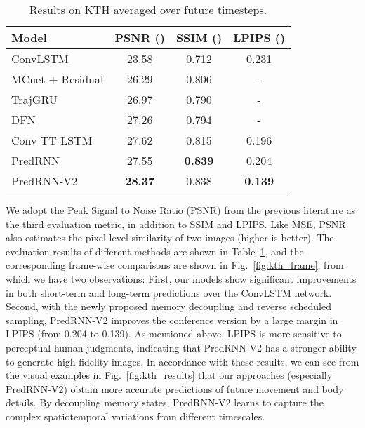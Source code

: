 \documentclass[10pt,journal,compsoc]{IEEEtran}
\newcommand{\tab}[1]{Table~\ref{#1}}
\newcommand{\fig}[1]{Fig.~\ref{#1}}
\begin{document}
\begin{table}[t]
\vskip 0.05in
  \caption{Results on KTH averaged over  future timesteps.
  }
  \vskip -0.05in
  \label{tab:kth}
  \centering
  \begin{tabular}{lccc}
    \toprule
    Model & PSNR () & SSIM () & LPIPS ()  \\
    \midrule
    ConvLSTM \cite{shi2015convolutional} & 23.58 & 0.712 & 0.231 \\
    MCnet + Residual \cite{Villegas2017Decomposing} & 26.29 & 0.806 & - \\
    TrajGRU \cite{shi2017deep} & 26.97 & 0.790 & - \\
    DFN \cite{de2016dynamic} & 27.26 & 0.794 & - \\
    Conv-TT-LSTM \cite{su2020convolutional} & 27.62 & 0.815 & 0.196 \\
    \midrule
    PredRNN & 27.55 & \textbf{0.839} & 0.204  \\
    PredRNN-V2 & \textbf{28.37} & 0.838 & \textbf{0.139}  \\
    \bottomrule
  \end{tabular}
  \vspace{-10pt}
\end{table}

We adopt the Peak Signal to Noise Ratio (PSNR) from the previous literature as the third evaluation metric, in addition to SSIM and LPIPS. Like MSE, PSNR also estimates the pixel-level similarity of two images (higher is better). 
The evaluation results of different methods are shown in \tab{tab:kth}, and the corresponding frame-wise comparisons are shown in \fig{fig:kth_frame}, from which we have two observations: First, our models show significant improvements in both short-term and long-term predictions over the ConvLSTM network. 
Second, with the newly proposed memory decoupling and reverse scheduled sampling, PredRNN-V2 improves the conference version by a large margin in LPIPS (from 0.204 to 0.139). 
As mentioned above, LPIPS is more sensitive to perceptual human judgments, indicating that PredRNN-V2 has a stronger ability to generate high-fidelity images.
In accordance with these results, we can see from the visual examples in
\fig{fig:kth_results} that our approaches (especially PredRNN-V2) obtain more accurate predictions of future movement and body details.
By decoupling memory states, PredRNN-V2 learns to capture the complex spatiotemporal variations from different timescales.
\end{document}

